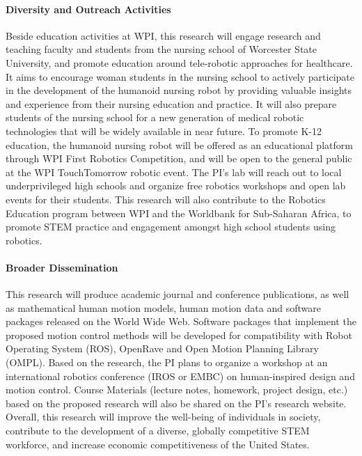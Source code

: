 \documentclass[letterpaper, 11 pt, onecolumn]{article}
\begin{document}





\paragraph*{Diversity and Outreach Activities}
Beside education activities at WPI, this research will engage research and teaching faculty and students from the nursing school of Worcester State University, and promote education around tele-robotic approaches for healthcare. It aims to encourage woman students in the nursing school to actively participate in the development of the humanoid nursing robot by providing valuable insights and experience from their nursing education and practice. It will also prepare students of the nursing school for a new generation of medical robotic technologies that will be widely available in near future. To promote K-12 education, the humanoid nursing robot will be offered as an educational platform through WPI First Robotics Competition, and will be open to the general public at the WPI TouchTomorrow robotic event. The PI's lab will reach out to local underprivileged high schools and organize free robotics workshops and open lab events for their students. This research will also contribute to the Robotics Education program between WPI and the Worldbank for Sub-Saharan Africa, to promote STEM practice and engagement amongst high school students using robotics. 

\paragraph*{Broader Dissemination}
This research will produce academic journal and conference publications, as well as mathematical human motion models, human motion data and software packages released on the World Wide Web. Software packages that implement the proposed motion control methods will be developed for compatibility with Robot
Operating System (ROS), OpenRave and Open Motion Planning Library (OMPL). Based on the research, the PI plans to organize a workshop at an international robotics conference (IROS or EMBC) on human-inspired design and motion control. Course Materials (lecture notes, homework, project design, etc.) based on the proposed research will also be shared on the PI's research website. Overall, this research will improve the well-being of individuals in society, contribute to the development of a diverse, globally competitive STEM workforce, and increase economic competitiveness of the United States.
\end{document}
